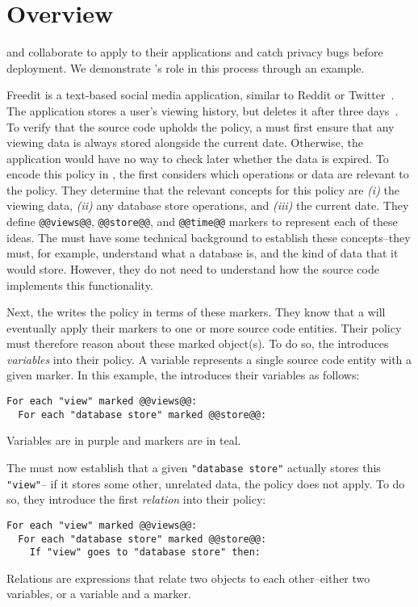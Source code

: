 \chapter{Overview}
\label{sec:overview}

\Ces{} and \devs{} collaborate to apply \sys{} to their applications and catch privacy bugs before deployment.
%
We demonstrate \syslang's role in this process through an example.

Freedit is a text-based social media application, similar to Reddit or Twitter~\cite{freedit}.
%
The application stores a user's viewing history, but deletes it after three days~\cite{freedit-pageviews}.
%
To verify that the source code upholds the policy, 
a \ce{} must first ensure that any viewing data is always stored alongside the current date.
%
Otherwise, the application would have no way to check later whether the data is expired.
%
To encode this policy in \syslang{}, the \ce{} first considers which operations or data are relevant to the policy.
%
They determine that the relevant concepts for this policy are \emph{(i)} the viewing data,
\emph{(ii)} any database store operations, and \emph{(iii)} the current date.
%
They define \lstinline[language=CNL]|@@views@@|, 
\lstinline[language=CNL]|@@store@@|, 
and \lstinline[language=CNL]|@@time@@| markers to represent each of these ideas.
%
The \ce{} must have some technical background to establish these concepts--they must, for example, understand what a database is,
and the kind of data that it would store.
%
However, they do not need to understand how the source code implements this functionality.
%

Next, the \ce{} writes the policy in terms of these markers.
%
They know that a \dev{} will eventually apply their markers to one or more source code entities.
%
Their policy must therefore reason about these marked object(s).
%
To do so, the \ce{} introduces \emph{variables} into their policy.
%
A variable represents a single source code entity with a given marker.
%
In this example, the \ce{} introduces their variables as follows:
\begin{lstlisting}[language=CNL]
For each "view" marked @@views@@:
  For each "database store" marked @@store@@:
\end{lstlisting}
%
Variables are in purple and markers are in teal.

The \ce{} must now establish that a given \lstinline[language=CNL]|"database store"| actually stores this \lstinline[language=CNL]|"view"|--
if it stores some other, unrelated data, the policy does not apply.
%
To do so, they introduce the first \emph{relation} into their policy:
\begin{lstlisting}[language=CNL]
For each "view" marked @@views@@:
  For each "database store" marked @@store@@:
    If "view" goes to "database store" then:
\end{lstlisting}
%
Relations are expressions that relate two objects to each other--either two variables, or a variable and a marker.

